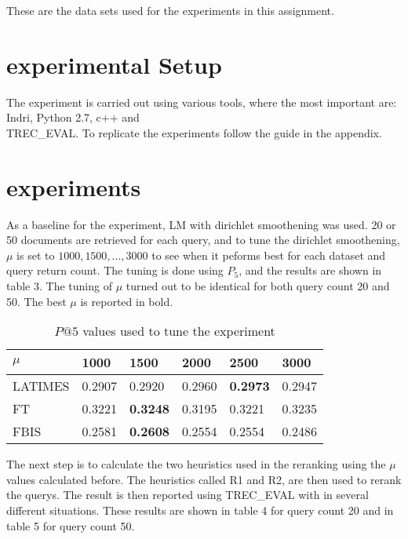 \documentclass{sig-alternate}
\begin{document}
These are the data sets used for the experiments in this assignment.

\section{experimental Setup}
The experiment is carried out using various tools, where the most important are: Indri, Python 2.7, c++ and \\TREC\_EVAL. To replicate the experiments follow the guide in the appendix.

\section{experiments}
As a baseline for the experiment, LM with dirichlet smoothening was used. 20 or 50 documents are retrieved for each query, and to tune the dirichlet smoothening, $\mu$ is set to ${1000,1500,...,3000}$ to see when it peforms best for each dataset and query return count. The tuning is done using $P_5$, and the results are shown in table 3. The tuning of $\mu$ turned out to be identical for both query count 20 and 50. The best $\mu$ is reported in bold.

\begin{table}[h!]
\centering
\caption{$P@5$ values used to tune the experiment}
\begin{tabular}{|l|l|l|l|l|l|}
\hline
 $\mu$ & 1000 & 1500 & 2000 & 2500 & 3000  \\ \hline
LATIMES & 0.2907 & 0.2920 & 0.2960 & \textbf{0.2973} & 0.2947 \\ \hline
FT & 0.3221 & \textbf{0.3248} & 0.3195 & 0.3221 & 0.3235  \\ \hline
FBIS & 0.2581 & \textbf{0.2608} & 0.2554 & 0.2554 & 0.2486 \\  \hline
\end{tabular}
\end{table}

The next step is to calculate the two heuristics used in the reranking using the $\mu$ values calculated before. The heuristics called R1 and R2, are then used to rerank the querys. The result is then reported using TREC\_EVAL with in several different situations. These results are shown in table 4 for query count 20 and in table 5 for query count 50.
\end{document}
